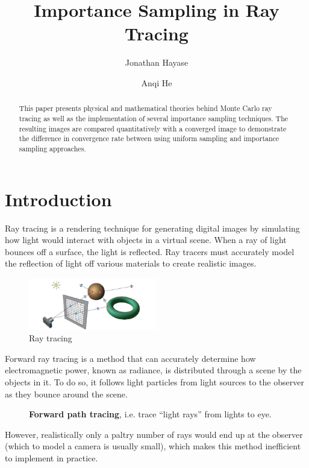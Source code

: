\documentclass[12pt]{article}
\title{Importance Sampling in Ray Tracing}
\author{Jonathan Hayase\and Anqi He}
\begin{document}
\maketitle
\begin{abstract}\noindent
  This paper presents physical and mathematical theories behind Monte Carlo ray tracing as well as the implementation of several importance sampling techniques.
  The resulting images are compared quantitatively with a converged image to demonstrate the difference in convergence rate between using uniform sampling and importance sampling approaches.
\end{abstract}

\section{Introduction}
Ray tracing is a rendering technique for generating digital images by simulating how light would interact with objects in a virtual scene.
When a ray of light bounces off a surface, the light is reflected.
Ray tracers must accurately model the reflection of light off various materials to create realistic images.
\begin{figure}[ht]
  \centering
    \includegraphics[width=0.5\textwidth]{figure1.png}
    \caption{Ray tracing}
\end{figure}
Forward ray tracing is a method that can accurately determine how electromagnetic power, known as radiance, is distributed through a scene by the objects in it.
To do so, it follows light particles from light sources to the observer as they bounce around the scene.
\begin{figure}[H]
  \centering
  \caption{\textbf{Forward path tracing}, i.e. trace ``light rays'' from lights to eye.}
\end{figure}
However, realistically only a paltry number of rays would end up at the observer (which to model a camera is usually small), which makes this method inefficient to implement in practice.
\end{document}
